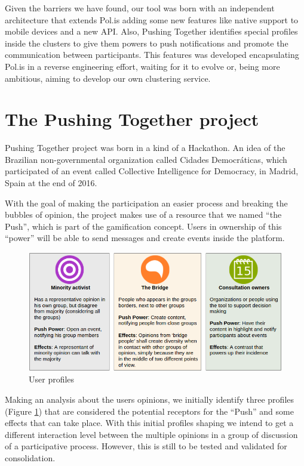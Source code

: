 \documentclass{llncs}
\begin{document}
  Given the barriers we have found, our tool was born with an independent
architecture that extends Pol.is adding some new features like native support
to mobile devices and a new API. Also, Pushing Together identifies special
profiles inside the clusters to give them powers to push notifications and promote
the communication between participants. This features was developed encapsulating
Pol.is in a reverse engineering effort, waiting for it to evolve or, being more ambitious,
aiming to develop our own clustering service.

\section{The Pushing Together project}
\label{sec:pushingtogether}

  Pushing Together project was born in a kind of a Hackathon. An idea of the
Brazilian non-governmental organization called Cidades Democráticas, which
participated of an event called Collective Intelligence for Democracy, in
Madrid, Spain at the end of 2016.

  With the goal of making the participation an easier process and breaking the
bubbles of opinion, the project makes use of a resource that we named ``the
Push'', which is part of the gamification concept. Users in ownership of this
``power'' will be able to send messages and create events inside the platform.

 \begin{figure}[hbt]
   \centering
     \includegraphics[keepaspectratio=true,scale=0.45]{images/userprofiles.png}
   \caption{User profiles}
   \label{fig:userprofiles}
 \end{figure}

  Making an analysis about the users opinions, we initially identify three
profiles (Figure \ref{fig:userprofiles}) that are considered the potential
receptors for the ``Push'' and some effects that can take place. With this
initial profiles shaping we intend to get a different interaction level between
the multiple opinions in a group of discussion of a participative process.
However, this is still to be tested and validated for consolidation.
\end{document}
